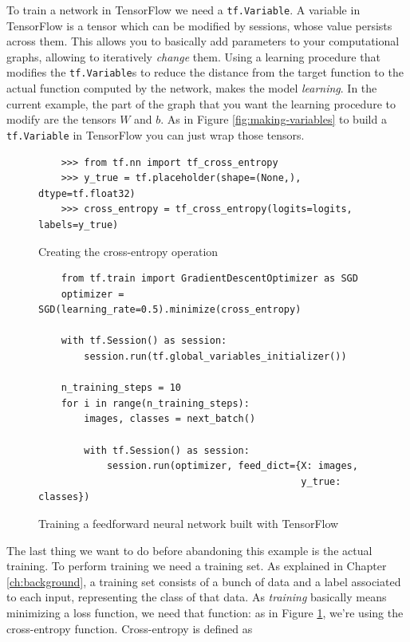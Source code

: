 To train a network in TensorFlow we need a \texttt{tf.Variable}. A
variable in TensorFlow is a tensor which can be modified by sessions,
whose value persists across them. This allows you to basically add
parameters to your computational graphs, allowing to iteratively
\emph{change} them. Using a learning procedure that modifies the
\texttt{tf.Variable}s to reduce the distance from the target function
to the actual function computed by the network, makes the model
\emph{learning}. In the current example, the part of the graph that you
want the learning procedure to modify are the tensors $W$ and $b$. As
in Figure \ref{fig:making-variables} to build a \texttt{tf.Variable} in
TensorFlow you can just wrap those tensors.

\begin{figure}
  \begin{verbatim}
    >>> from tf.nn import tf_cross_entropy
    >>> y_true = tf.placeholder(shape=(None,), dtype=tf.float32)
    >>> cross_entropy = tf_cross_entropy(logits=logits, labels=y_true)
  \end{verbatim}
  \caption{Creating the cross-entropy operation}
  \label{fig:cross-entropy}
\end{figure}

\begin{figure}
  \begin{verbatim}
    from tf.train import GradientDescentOptimizer as SGD
    optimizer = SGD(learning_rate=0.5).minimize(cross_entropy)

    with tf.Session() as session:
        session.run(tf.global_variables_initializer())

    n_training_steps = 10
    for i in range(n_training_steps):
        images, classes = next_batch()

        with tf.Session() as session:
            session.run(optimizer, feed_dict={X: images,
                                              y_true: classes})
  \end{verbatim}
  \caption{Training a feedforward neural network built with TensorFlow}
  \label{fig:training-network}
\end{figure}

The last thing we want to do before abandoning this example is the
actual training. To perform training we need a training set. As
explained in Chapter \ref{ch:background}, a training set consists of a
bunch of data and a label associated to each input, representing the
class of that data. As \emph{training} basically means minimizing a
loss function, we need that function: as in Figure
\ref{fig:cross-entropy}, we're using the cross-entropy function.
Cross-entropy is defined as

